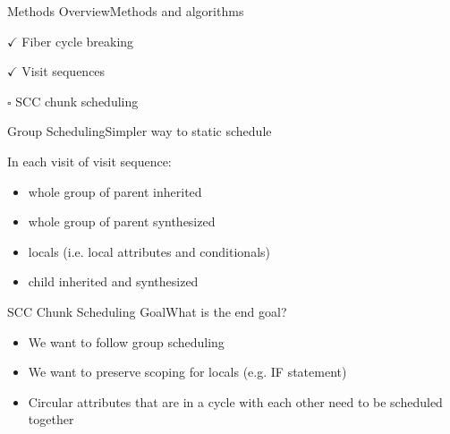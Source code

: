 \begin{frame}{Methods Overview}{Methods and algorithms}
     \begin{description}
        \item $\checkmark$ Fiber cycle breaking
        \item $\checkmark$  Visit sequences
        \item $\square$  \alert{SCC chunk scheduling}
    \end{description}
\end{frame}



\begin{frame}{Group Scheduling}{Simpler way to static schedule}

In each visit of visit sequence:
\begin{itemize}
    \item whole group of parent inherited
    \item whole group of parent synthesized
    \item locals (i.e. local attributes and conditionals)
    \item child inherited and synthesized
\end{itemize}
\end{frame}



\begin{frame}{SCC Chunk Scheduling Goal}{What is the end goal?}
    \begin{itemize}
        \item We want to follow group scheduling
        \item We want to preserve scoping for locals (e.g. IF statement)
        \item Circular attributes that are in a cycle with each other need to be scheduled together
    \end{itemize}
\end{frame}

